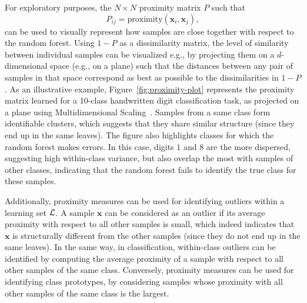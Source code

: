 For exploratory purposes, the $N\times N$ proximity matrix $P$ such that
\begin{equation}
P_{ij} = \text{proximity}(\mathbf{x}_i, \mathbf{x}_j),
\end{equation}
can be used to visually represent how samples are close together with respect
to the random forest. Using $1-P$ as a dissimilarity matrix,  the level of
similarity between individual samples can be visualized e.g., by projecting them
on a $d$-dimensional space (e.g., on a plane) such that the distances
between any pair of samples in that space correspond as best as possible to the
dissimilarities in $1-P$. As an illustrative example, Figure~\ref{fig:proximity-plot}
represents the proximity matrix learned for a 10-class handwritten digit
classification task, as projected on a plane using Multidimensional Scaling~\citep{kruskal:1964}.
Samples from a same class form identifiable clusters, which suggests that
they share similar structure (since they end up in the same leaves). The figure
also highlights classes for which the random forest makes errors. In this case,
digits $1$ and $8$ are the more dispersed, suggesting high within-class variance,
but also overlap the most with samples of other classes, indicating
that the random forest fails to identify the true class for these samples.

Additionally, proximity measures can be used for identifying outliers within a
learning set ${\cal L}$. A sample $\mathbf{x}$ can be considered as an outlier
if its average proximity with respect to all other samples is small, which
indeed indicates that $\mathbf{x}$ is structurally different from the other
samples (since they do not end up in the same leaves). In the same way, in
classification, within-class outliers can be identified by computing the
average proximity of a sample with respect to all other samples of the same
class. Conversely, proximity measures can be used for identifying class
prototypes, by considering samples whose proximity with all other samples
of the same class is the largest.

